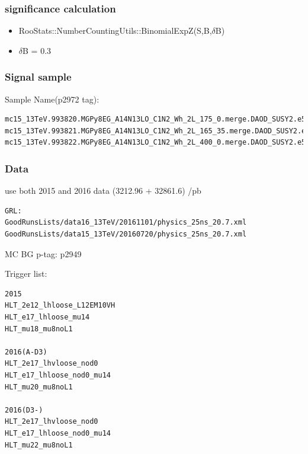 \documentclass[mathserif,serif]{beamer}
\begin{document}
\begin{frame}
\frametitle{significance calculation}
\begin{itemize}
\item RooStats::NumberCountingUtils::BinomialExpZ(S,B,$\delta$B)
\item $\delta$B = 0.3
\end{itemize}
\end{frame}

\begin{frame}[fragile]
\frametitle{Signal sample}
\small
Sample Name(p2972 tag):
\tiny
\begin{verbatim}
mc15_13TeV.993820.MGPy8EG_A14N13LO_C1N2_Wh_2L_175_0.merge.DAOD_SUSY2.e5678_a766_a821_r7676_p2949_p2972
mc15_13TeV.993821.MGPy8EG_A14N13LO_C1N2_Wh_2L_165_35.merge.DAOD_SUSY2.e5678_a766_a821_r7676_p2949_p2972
mc15_13TeV.993822.MGPy8EG_A14N13LO_C1N2_Wh_2L_400_0.merge.DAOD_SUSY2.e5678_a766_a821_r7676_p2949_p2972
\end{verbatim}
\end{frame}

\begin{frame}[fragile]
\frametitle{Data}
\small
use both 2015 and 2016 data (3212.96 + 32861.6) /pb
\tiny
\begin{verbatim}
GRL:
GoodRunsLists/data16_13TeV/20161101/physics_25ns_20.7.xml
GoodRunsLists/data15_13TeV/20160720/physics_25ns_20.7.xml
\end{verbatim}
\end{frame}

\begin{frame}{MC BG}
p-tag: p2949
\end{frame}

\begin{frame}[fragile]
\small
Trigger list:\\
\scriptsize
\begin{verbatim}
2015
HLT_2e12_lhloose_L12EM10VH
HLT_e17_lhloose_mu14
HLT_mu18_mu8noL1

2016(A-D3)
HLT_2e17_lhvloose_nod0
HLT_e17_lhloose_nod0_mu14
HLT_mu20_mu8noL1

2016(D3-)
HLT_2e17_lhvloose_nod0
HLT_e17_lhloose_nod0_mu14
HLT_mu22_mu8noL1
\end{verbatim}
\end{frame}
\end{document}

